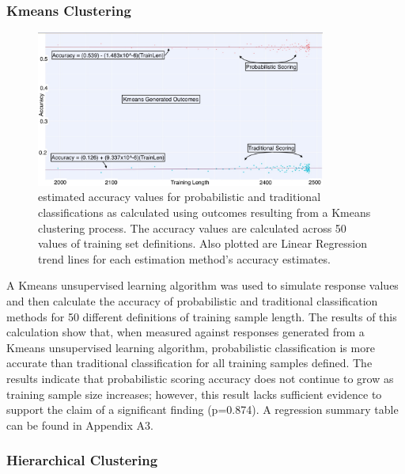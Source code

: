 \documentclass[12pt,]{article}
\begin{document}
\hypertarget{kmeans-clustering-1}{%
\subsubsection{Kmeans Clustering}\label{kmeans-clustering-1}}

\begin{figure}[h!]
\begin{center}
\includegraphics[width=0.85\textwidth]{KMeansResultsGraph.jpeg}
\end{center}
\caption[Kmeans Clustering Result Plot]{estimated accuracy values for probabilistic and traditional classifications as calculated using outcomes resulting from a Kmeans clustering process.  The accuracy values are calculated across 50 values of training set definitions.  Also plotted are Linear Regression trend lines for each estimation method's accuracy estimates.}
\end{figure}

A Kmeans unsupervised learning algorithm was used to simulate response
values and then calculate the accuracy of probabilistic and traditional
classification methods for 50 different definitions of training sample
length. The results of this calculation show that, when measured against
responses generated from a Kmeans unsupervised learning algorithm,
probabilistic classification is more accurate than traditional
classification for all training samples defined. The results indicate
that probabilistic scoring accuracy does not continue to grow as
training sample size increases; however, this result lacks sufficient
evidence to support the claim of a significant finding (p=0.874). A
regression summary table can be found in Appendix A3.

\newpage

\hypertarget{hierarchical-clustering-1}{%
\subsubsection{Hierarchical
Clustering}\label{hierarchical-clustering-1}}
\end{document}
